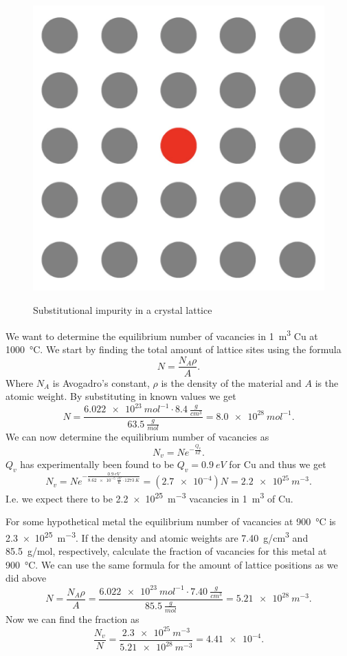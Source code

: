 \begin{figure} [ht]
  \centering
  \caption{Substitutional impurity in a crystal lattice}
  \includegraphics[width=0.3\linewidth]{./figures/f4_5.png}
  \label{fig:f4_5}
\end{figure}

\begin{exa}
  We want to determine the equilibrium number of vacancies in \qty{1}{m^3} Cu at \qty{1000}{\celsius}.
  \bigbreak
  We start by finding the total amount of lattice sites using the formula
  \[ 
  N = \frac{N_A \rho}{A}
  .\]
  Where $N_A$ is Avogadro's constant, $\rho$ is the density of the material and $A$ is the atomic weight. By substituting in known values we get
  \[ 
    N = \frac{\qty{6,022e23}{mol^{-1}} \cdot \qty{8,4}{\frac{g}{cm^3}}}{\qty{63,5}{\frac{g}{mol}}} = \qty{8,0e28}{mol^{-1}} 
  .\]
  We can now determine the equilibrium number of vacancies as
  \[ 
  N_v = N e^{- \frac{Q_v}{k T}}
  .\]
  $Q_v$ has experimentally been found to be $Q_v = \qty{0,9}{eV}$ for Cu and thus we get
  \[ 
  N_v = N e^{-\frac{\qty{0,9}{eV}}{\qty{8,62e-5}{\frac{eV}{K}} \cdot \qty{1273}{K}}} = \left( \num{2,7e-4}  \right)N = \qty{2,2e25}{m^{-3}} 
  .\]
  I.e. we expect there to be \qty{2,2e25}{m^{-3}} vacancies in \qty{1}{m^3}  of Cu. 
\end{exa}

\begin{exa}
  For some hypothetical metal the equilibrium number of vacancies at \qty{900}{\celsius} is \qty{2,3e25}{m^{-3}}. If the density and atomic weights are \qty{7,40}{g/cm^3} and \qty{85,5}{g/mol}, respectively, calculate the fraction of vacancies for this metal at \qty{900}{\celsius}.
  \bigbreak
  We can use the same formula for the amount of lattice positions as we did above
  \[ 
  N = \frac{N_A \rho}{A} = \frac{\qty{6,022e23}{mol^{-1}} \cdot \qty{7,40}{\frac{g}{cm^3}}}{\qty{85,5}{\frac{g}{mol}}} = \qty{5,21e28}{m^{-3}}
  .\]
  Now we can find the fraction as
  \[ 
    \frac{N_v}{N} = \frac{\qty{2,3e25}{m^{-3}}}{\qty{5,21e28}{m^{-3}}} = \num{4,41e-4}
  .\]
\end{exa}

